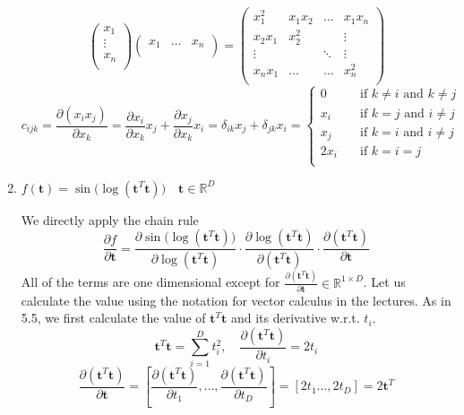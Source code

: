 \begin{enumerate}[label=\alph*]
\[\begin{pmatrix}
    x_1   \\
    \vdots \\
    x_n \\
\end{pmatrix}
\begin{pmatrix}
    x_1 & \dots & x_n \\
\end{pmatrix} = \begin{pmatrix}
    x^2_1 & x_1 x_2 & \dots & x_1 x_n \\
    x_2 x_1 & x^2_2 &    & \vdots \\
    \vdots & & \ddots &  \vdots \\
    x_n x_1 & \dots & \dots & x^2_n \\
\end{pmatrix}
\]
\[
c_{ijk} = \frac{\partial (x_i x_j)}{\partial x_k} = \frac{\partial x_i}{\partial x_k} x_j + \frac{\partial x_j}{\partial x_k} x_i = \delta_{ik}x_j + \delta_{jk}x_i=  \begin{cases}
0 \quad &\text{if }k\neq i \text{ and } k\neq j\\
x_i \quad &\text{if }k=j \text{ and } i\neq j\\
x_j \quad &\text{if }k=i \text{ and } i\neq j\\
2x_i \quad &\text{if }k=i=j\\
\end{cases}
\]

    \item  $f(\textbf{t}) = \sin\big(\log(\textbf{t}^T\textbf{t})\big) \quad \textbf{t} \in \mathbb{R}^D$
    
We directly apply the chain rule
\[
\frac{\partial f}{\partial \textbf{t}} = \frac{\partial \sin\big(\log(\textbf{t}^T\textbf{t})\big)}{\partial \log(\textbf{t}^T\textbf{t})} \cdot \frac{\partial \log(\textbf{t}^T\textbf{t})}{\partial (\textbf{t}^T\textbf{t})} \cdot \frac{\partial (\textbf{t}^T\textbf{t})}{\partial \textbf{t}} 
\]
All of the terms are one dimensional except for $\frac{\partial (\textbf{t}^T\textbf{t})}{\partial \textbf{t}} \in\mathbb{R}^{1\times D}$. Let us calculate the value using the notation for vector calculus in the lectures. As in 5.5, we first calculate the value of $\textbf{t}^T\textbf{t}$ and its derivative w.r.t. $t_i$.
\[
\textbf{t}^T\textbf{t} = \sum_{i=1}^D t_i^2, \quad \frac{\partial (\textbf{t}^T\textbf{t})}{\partial t_i} = 2t_i
\]
\[
\frac{\partial (\textbf{t}^T\textbf{t})}{\partial \textbf{t}} = \left[\frac{\partial (\textbf{t}^T\textbf{t})}{\partial t_1}, \dots, \frac{\partial (\textbf{t}^T\textbf{t})}{\partial t_D}\right] = \left[2t_1 \dots, 2t_D\right] = 2\textbf{t}^T
\]


\end{enumerate}
